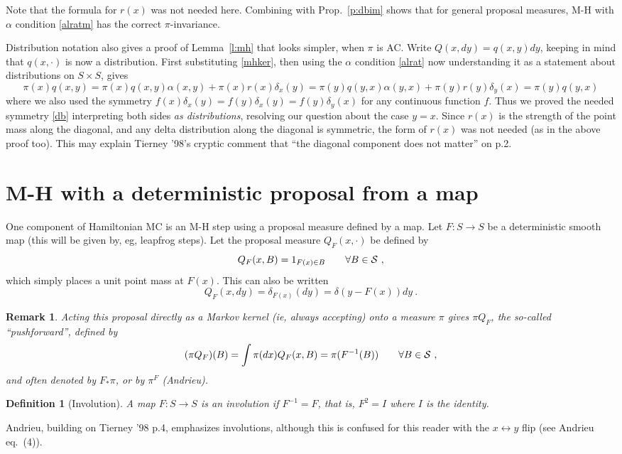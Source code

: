 \documentclass[10pt]{article}
\newtheorem{rmk}[thm]{Remark}
\newtheorem{dfn}[thm]{Definition}
\newcommand{\al}{\alpha}
\begin{document}
Note that the formula for $r(x)$ was not needed here.
Combining with Prop.~\ref{p:dbim} shows that for general proposal measures,
M-H with $\al$ condition \eqref{alratm} has the correct $\pi$-invariance.

Distribution notation also gives a proof of Lemma~\ref{l:mh} that looks
simpler, when $\pi$ is AC.
Write $Q(x,dy)=q(x,y)dy$, keeping in mind that $q(x,\cdot)$
is now a distribution.
First substituting \eqref{mhker}, then using the $\al$ condition \eqref{alrat}
now understanding it as a statement about distributions on $S \times S$, gives
$$
\pi(x)q(x,y) = \pi(x) q(x,y)\al(x,y) + \pi(x) r(x) \delta_x(y)
= \pi(y) q(y,x)\al(y,x) + \pi(y) r(y) \delta_y(x) = \pi(y)q(y,x)
$$
where we also used the symmetry $f(x) \delta_x(y) = f(y) \delta_x(y) = f(y) \delta_y(x)$ for
any continuous function $f$.
Thus we proved the needed symmetry \eqref{db} interpreting both sides
{\em as distributions},
resolving our question about the case $y=x$.
Since $r(x)$ is the strength of the point mass along the diagonal,
and any delta distribution along the diagonal is symmetric, the form of $r(x)$ was not needed (as in the above proof too).
This may explain Tierney '98's cryptic comment
that ``the diagonal component does not matter'' on p.2.



\section{M-H with a deterministic proposal from a map}

One component of Hamiltonian MC is an M-H step using a proposal measure defined by a map.
Let $F: S\to S$ be a deterministic smooth map (this will be given by, eg,
leapfrog steps).
Let the proposal measure $Q_F(x,\cdot)$ be defined by
$$
Q_F(x,B) = 1_{F(x)\in B} \qquad \forall B \in \cal S~,
$$
which simply places a unit point mass at $F(x)$.
This can also be written
$$
Q_F(x,dy) = \delta_{F(x)}(dy) = \delta(y - F(x)) dy ~.
$$
\begin{rmk} Acting this proposal directly as a Markov kernel (ie, always accepting) onto a measure $\pi$ gives $\pi Q_F$, the so-called ``pushforward'',
  defined by
$$
(\pi Q_F)(B) = \int \pi(dx) Q_F(x,B) = \pi(F^{-1}(B)) \qquad \forall B \in \cal S~,
$$
and often denoted by $F_\ast \pi$, or by $\pi^F$ (Andrieu).
\end{rmk}

\begin{dfn}[Involution]
  A map $F:S\to S$ is an involution if $F^{-1} = F$,
  that is, $F^2=I$ where $I$ is the identity.
\end{dfn}
Andrieu, building on Tierney '98 p.4, emphasizes involutions,
although this is confused for this reader with the $x\leftrightarrow y$ flip
(see Andrieu eq.~(4)).
\end{document}
